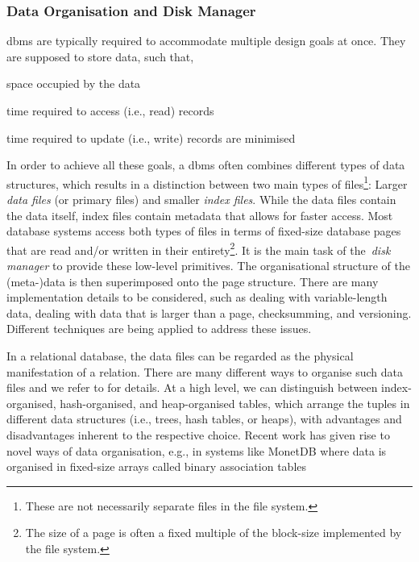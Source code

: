 \subsubsection{Data Organisation and Disk Manager}
\acrshort{dbms} are typically required to accommodate multiple design goals at once. They are supposed to store data, such that,
\begin{enumerate*}[label=(\roman*),itemjoin={{, }}, itemjoin*={{, and, }}, after={{.}}]
    \item space occupied by the data
    \item time required to access (i.e., read) records
    \item time required to update (i.e., write) records are minimised
\end{enumerate*}
In order to achieve all these goals, a \acrshort{dbms} often combines different types of data structures, which results in a distinction between two main types of files\footnote{These are not necessarily separate files in the file system.}: Larger \emph{data files} (or primary files) and smaller \emph{index files}. While the data files contain the data itself, index files contain metadata that allows for faster access. Most database systems access both types of files in terms of fixed-size database pages that are read and/or written in their entirety\footnote{The size of a page is often a fixed multiple of the block-size implemented by the file system.}. It is the main task of the \emph{disk manager} to provide these low-level primitives. The organisational structure of the (meta-)data is then superimposed onto the page structure. There are many implementation details to be considered, such as dealing with variable-length data, dealing with data that is larger than a page, checksumming, and versioning. Different techniques are being applied to address these issues.

In a relational database, the data files can be regarded as the physical manifestation of a relation. There are many different ways to organise such data files and we refer to \cite{Petrov:2019Database} for details. At a high level, we can distinguish between index-organised, hash-organised, and heap-organised tables, which arrange the tuples in different data structures (i.e., trees, hash tables, or heaps), with advantages and disadvantages inherent to the respective choice. Recent work has given rise to novel ways of data organisation, e.g., in systems like MonetDB where data is organised in fixed-size arrays called binary association tables \cite{Boncz:2008Breaking}

